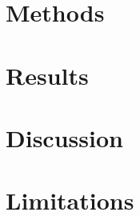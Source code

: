 \documentclass[12pt]{article}
\begin{document}
\section{Methods}


\section{Results}


\section{Discussion}


\section{Limitations}


\clearpage


\end{document}
